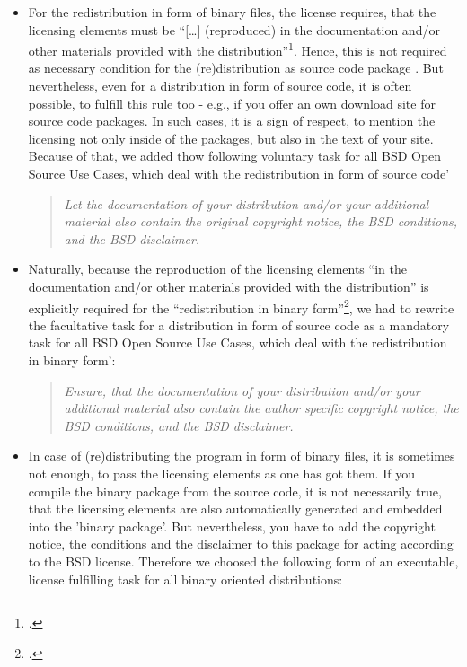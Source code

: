 \begin{itemize}
\item For the redistribution in form of binary files, the license requires,
that the licensing elements must be \enquote{[\ldots] (reproduced) in the documentation
and/or other materials provided with the
distribution}\footcite[cf.][\nopage wp]{BsdLicense2Clause}. Hence, this is
not required as necessary condition for the (re)distribution as source code
package . But nevertheless, even for a distribution in form of source code, it
is often possible, to fulfill this rule too - e.g., if you offer an own download
site for source code packages. In such cases, it is a sign of respect, to
mention the licensing not only inside of the packages, but also in the text of
your site. Because of that, we added thow following voluntary task for all BSD
Open Source Use Cases, which deal with the redistribution in form of source
code'

\begin{quote}\textit{Let the documentation of your distribution and/or your
additional material also contain the original copyright notice, the BSD
conditions, and the BSD disclaimer.}\end{quote}

\item Naturally, because the reproduction of the licensing elements \enquote{in
the documentation and/or other materials provided with the distribution}
is explicitly required for the \enquote{redistribution in binary
form}\footcite[cf.][\nopage wp]{BsdLicense2Clause}, we had to rewrite the
facultative task for a distribution in form of source code as a mandatory task
for all BSD Open Source Use Cases, which deal with the redistribution in binary
form':

\begin{quote}\textit{Ensure, that the documentation of your distribution and/or
your additional material also contain the author specific copyright notice, the
BSD conditions, and the BSD disclaimer.}\end{quote}

\item In case of (re)distributing the program in form of binary files, it is
sometimes not enough, to pass the licensing elements as one has got them. If you
compile the binary package from the source code, it is not necessarily true,
that the licensing elements are also automatically generated and embedded into
the 'binary package'. But nevertheless, you have to add the copyright notice,
the conditions and the disclaimer to this package for acting according to the
BSD license. Therefore we choosed the following form of an executable, license
fulfilling task for all binary oriented distributions:


\end{itemize}
